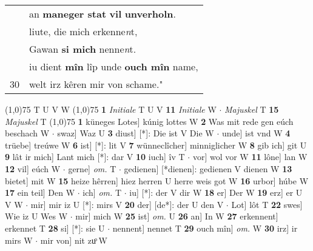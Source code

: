 \documentclass[8pt,a4paper,notitlepage]{article}
\begin{document}
\begin{table}[ht]
\begin{minipage}[t]{0.5\linewidth}
\begin{tabular}{rl}
 & an \textbf{maneger stat} \textbf{vil} \textbf{unverholn}.\\ 
 & liute, die mich erkenne\textit{n}t,\\ 
 & Gawan \textbf{si mich} nenne\textit{n}t.\\ 
 & iu dient \textbf{mîn} lîp unde \textbf{ouch mîn} name,\\ 
30 & welt irz kêren mir von schame."\\ 
\end{tabular}
\scriptsize
\line(1,0){75} \newline
T U V W \newline
\line(1,0){75} \newline
\textbf{1} \textit{Initiale} T U V  \textbf{11} \textit{Initiale} W   $\cdot$ \textit{Majuskel} T  \textbf{15} \textit{Majuskel} T  \newline
\line(1,0){75} \newline
\textbf{1} küneges Lotes] kúnig lottes W \textbf{2} Was mit rede gen eúch beschach W  $\cdot$ swaz] Waz U \textbf{3} diust] [*]: Die ist V Die W  $\cdot$ unde] ist vnd W \textbf{4} trüebe] treúwe W \textbf{6} ist] [*]: lit V \textbf{7} wünneclîcher] minniglicher W \textbf{8} gib ich] git U \textbf{9} lât ir mich] Lant mich [*]: dar V \textbf{10} iuch] îv T  $\cdot$ vor] wol vor W \textbf{11} lône] lan W \textbf{12} vil] eúch W  $\cdot$ gerne] \textit{om.} T  $\cdot$ gedienen] [*dienen]: gedienen V dienen W \textbf{13} bietet] mit W \textbf{15} heize hêrren] hiez herren U herre weis got W \textbf{16} urbor] húbe W \textbf{17} ein teil] Den W  $\cdot$ ich] \textit{om.} T  $\cdot$ iu] [*]: der V dir W \textbf{18} er] Der W \textbf{19} erz] er U V W  $\cdot$ mir] mir iz U [*]: mirs V \textbf{20} der] [de*]: der U den V  $\cdot$ Lot] lôt T \textbf{22} swes] Wie iz U Wes W  $\cdot$ mir] mich W \textbf{25} ist] \textit{om.} U \textbf{26} an] In W \textbf{27} erkennent] erkennet T \textbf{28} si] [*]: sie U  $\cdot$ nennent] nennet T \textbf{29} ouch mîn] \textit{om.} W \textbf{30} irz] ir mirs W  $\cdot$ mir von] nit zuͦ W \newline
\end{minipage}
\end{table}
\end{document}
